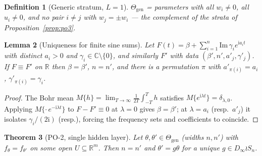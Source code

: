 \documentclass[11pt]{article}
\newtheorem{theorem}{Theorem}[section]
\newtheorem{lemma}[theorem]{Lemma}
\newtheorem{definition}[theorem]{Definition}
\newcommand{\R}{\mathbb{R}}
\newcommand{\Dinf}{D_\infty}
\begin{document}
\begin{definition}[Generic stratum, $L=1$]
$\Theta_{\mathrm{gen}}$ = parameters with all $w_i\ne0$, all $u_i\ne 0$, and no pair $i\ne j$ with
$w_j=\pm w_i$ — the complement of the strata of Proposition~\ref{prop:po3}.
\end{definition}

\begin{lemma}[Uniqueness for finite sine sums]\label{lem:bohr}
Let $F(t)=\beta+\sum_{i=1}^{n}\mathrm{Im}\,\gamma_i e^{\mathrm i a_i t}$ with distinct $a_i>0$ and
$\gamma_i\in\mathbb C\setminus\{0\}$, and similarly $F'$ with data
$(\beta',n',a'_j,\gamma'_j)$. If $F\equiv F'$ on $\R$ then $\beta=\beta'$, $n=n'$, and there is a
permutation $\pi$ with $a'_{\pi(i)}=a_i$, $\gamma'_{\pi(i)}=\gamma_i$.
\end{lemma}

\begin{proof}
The Bohr mean $M\{h\}=\lim_{T\to\infty}\frac1{2T}\int_{-T}^{T}h$ satisfies
$M\{e^{\mathrm i\lambda t}\}=\delta_{\lambda,0}$. Applying $M\{\cdot\,e^{-\mathrm i\lambda t}\}$
to $F-F'\equiv0$ at $\lambda=0$ gives $\beta=\beta'$; at $\lambda=a_i$ (resp.\ $a'_j$) it isolates
$\gamma_i/(2\mathrm i)$ (resp.), forcing the frequency sets and coefficients to coincide.
\end{proof}

\begin{theorem}[PO-2, single hidden layer]\label{thm:po2}
Let $\theta,\theta'\in\Theta_{\mathrm{gen}}$ (widths $n,n'$) with $f_\theta=f_{\theta'}$ on some
open $U\subseteq\R^m$. Then $n=n'$ and $\theta'=g\theta$ for a \emph{unique}
$g\in \Dinf\wr S_n$.
\end{theorem}
\end{document}
